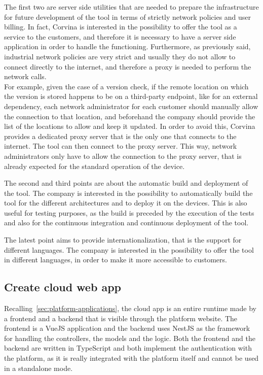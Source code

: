 The first two are server side utilities that are needed to prepare the infrastructure for future development of the tool in terms of strictly network policies and user billing. In fact, Corvina is interested in the possibility to offer the tool as a service to the customers, and therefore it is necessary to have a server side application in order to handle the functioning. Furthermore, as previously said, industrial network policies are very strict and usually they do not allow to connect directly to the internet, and therefore a proxy is needed to perform the network calls. \\
For example, given the case of a version check, if the remote location on which the version is stored happens to be on a third-party endpoint, like for an external dependency, each network administrator for each customer should manually allow the connection to that location, and beforehand the company should provide the list of the locations to allow and keep it updated. In order to avoid this, Corvina provides a dedicated proxy server that is the only one that connects to the internet. The tool can then connect to the proxy server. This way, network administrators only have to allow the connection to the proxy server, that is already expected for the standard operation of the device.

The second and third points are about the automatic build and deployment of the tool. The company is interested in the possibility to automatically build the tool for the different architectures and to deploy it on the devices. This is also useful for testing purposes, as the build is preceded by the execution of the tests and also for the continuous integration and continuous deployment of the tool.

The latest point aims to provide internationalization, that is the support for different languages. The company is interested in the possibility to offer the tool in different languages, in order to make it more accessible to customers.

\subsection{Create cloud web app}

Recalling~\cref{sec:platform-applications}, the cloud app is an entire runtime made by a frontend and a backend that is visible through the platform website. The frontend is a VueJS application and the backend uses NestJS as the framework for handling the controllers, the models and the logic. Both the frontend and the backend are written in TypeScript and both implement the authentication with the platform, as it is really integrated with the platform itself and cannot be used in a standalone mode.

